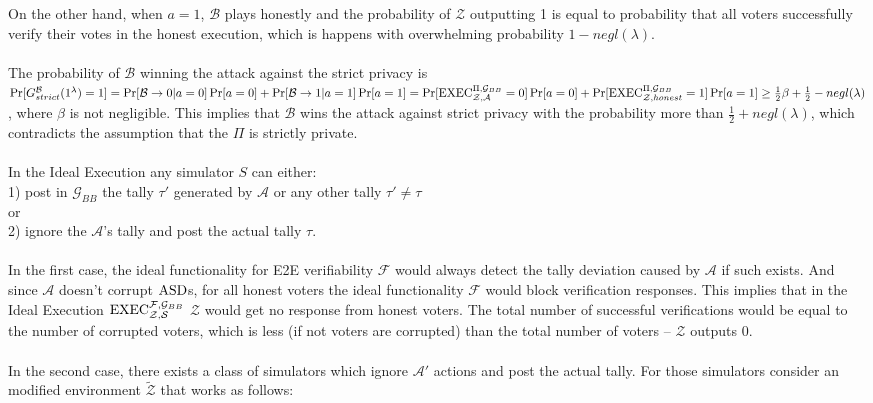 On the other hand, when $a=1$, $\mathcal{B}$ plays honestly and the probability of $\mathcal{Z}$ outputting 1 is equal to probability that all voters successfully verify their votes in the honest execution, which is happens with overwhelming probability $1-negl(\lambda)$.\\\\ 
The probability of $\mathcal{B}$  winning the attack against the strict privacy is \\$\Pr[G_{strict}^{\mathcal{B}}(1^{\lambda})=1]= \Pr[\mathcal{B} \rightarrow 0| a=0]\Pr[a=0] + \Pr[\mathcal{B} \rightarrow 1| a=1]\Pr[a=1] =  \Pr[\operatorname{EXEC}_{\mathcal{Z},\mathcal{A}}^{\Pi, \mathcal{G}_{BB}}=0]\Pr[a=0]  + \Pr[\operatorname{EXEC}_{\mathcal{Z},honest}^{\Pi, \mathcal{G}_{BB}} =1]\Pr[a=1] \geq \frac{1}{2}\beta+ \frac{1}{2} - negl(\lambda)$ , where $\beta$ is not negligible. This implies that $\mathcal{B}$ wins the attack against strict privacy with the probability more than $\frac{1}{2} + negl(\lambda)$, which contradicts the assumption that the $\Pi$ is strictly private.\\\\
In the Ideal Execution any simulator $S$ can either:\\
1) post in $\mathcal{G}_{BB}$ the tally $\tau'$ generated by $\mathcal{A}$ or any other tally  $\tau' \neq \tau$\\ 
or\\
2) ignore the $\mathcal{A}$'s tally and post the actual tally $\tau$.\\\\
In the first case, the ideal functionality for E2E verifiability  $\mathcal{F}$  would always detect the tally deviation caused by $\mathcal{A}$ if such exists. And since  $\mathcal{A}$ doesn't corrupt $\operatorname{ASD}$s, for all honest voters the ideal functionality $\mathcal{F}$ would block verification responses. This implies that in the Ideal Execution $\operatorname{EXEC}_{\mathcal{Z}, \mathcal{S}}^{\mathcal{F}, \mathcal{G}_{BB}}$ $\mathcal{Z}$ would get no response from honest voters. The total number of successful verifications would be equal to the number of corrupted voters, which is less (if not voters are corrupted) than the total number of voters -- $\mathcal{Z}$ outputs 0.  \\\\
In the second case, there exists a class of simulators which ignore $\mathcal{A'}$ actions and post the actual tally.  For those simulators consider an modified  environment $\tilde{\mathcal{Z}}$ that works as follows:\\\\

